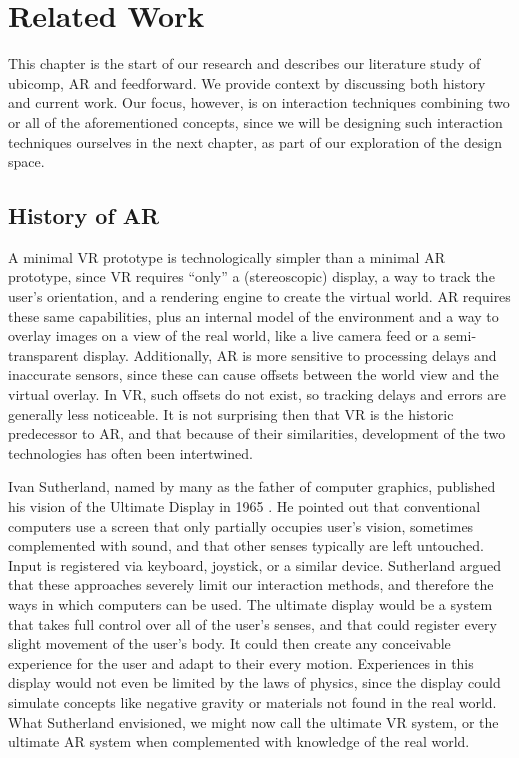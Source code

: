 \chapter{Related Work} \label{chap:relat}
This chapter is the start of our research and describes our literature study of ubicomp, AR and feedforward. We provide context by discussing both history and current work. Our focus, however, is on interaction techniques combining two or all of the aforementioned concepts, since we will be designing such interaction techniques ourselves in the next chapter, as part of our exploration of the design space.

\section{History of AR} \label{sec:relat:ar}
A minimal VR prototype is technologically simpler than a minimal AR prototype, since VR requires ``only'' a (stereoscopic) display, a way to track the user's orientation, and a rendering engine to create the virtual world. AR requires these same capabilities, plus an internal model of the environment and a way to overlay images on a view of the real world, like a live camera feed or a semi-transparent display. Additionally, AR is more sensitive to processing delays and inaccurate sensors, since these can cause offsets between the world view and the virtual overlay. In VR, such offsets do not exist, so tracking delays and errors are generally less noticeable. It is not surprising then that VR is the historic predecessor to AR, and that because of their similarities, development of the two technologies has often been intertwined.

Ivan Sutherland, named by many as the father of computer graphics, published his vision of the Ultimate Display in 1965 \cite{sutherland1965ultimate}. He pointed out that conventional computers use a screen that only partially occupies user's vision, sometimes complemented with sound, and that other senses typically are left untouched. Input is registered via keyboard, joystick, or a similar device. Sutherland argued that these approaches severely limit our interaction methods, and therefore the ways in which computers can be used. The ultimate display would be a system that takes full control over all of the user's senses, and that could register every slight movement of the user's body. It could then create any conceivable experience for the user and adapt to their every motion. Experiences in this display would not even be limited by the laws of physics, since the display could simulate concepts like negative gravity or materials not found in the real world. What Sutherland envisioned, we might now call the ultimate VR system, or the ultimate AR system when complemented with knowledge of the real world.

